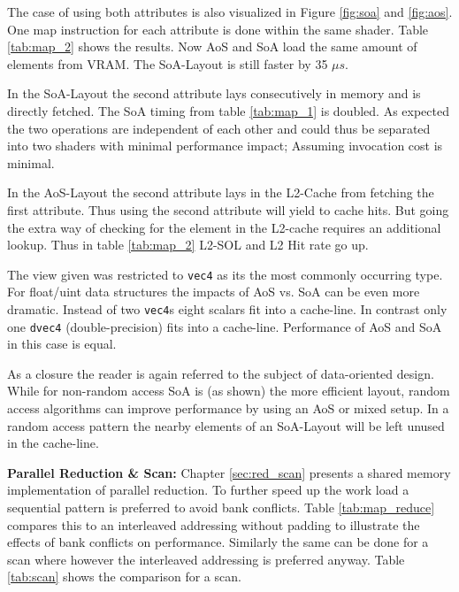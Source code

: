 \documentclass[m,times]{cgMA}
\begin{document}
The case of using both attributes is also visualized in Figure \ref{fig:soa} and \ref{fig:aos}. One map instruction for each attribute is done within the same shader. Table \ref{tab:map_2} shows the results. Now AoS and SoA load the same amount of elements from VRAM. The SoA-Layout is still faster by 35 $\mu s$.

In the SoA-Layout the second attribute lays consecutively in memory and is directly fetched. The SoA timing from table \ref{tab:map_1} is doubled. As expected the two operations are independent of each other and could thus be separated into two shaders with minimal performance impact; Assuming invocation cost is minimal.

In the AoS-Layout the second attribute lays in the L2-Cache from fetching the first attribute. Thus using the second attribute will yield to cache hits. But going the extra way of checking for the element in the L2-cache requires an additional lookup. Thus in table \ref{tab:map_2} L2-SOL and L2 Hit rate go up.

The view given was restricted to \texttt{vec4} as its the most commonly occurring type. For float/uint data structures the impacts of AoS vs. SoA can be even more dramatic. Instead of two \texttt{vec4}s eight scalars fit into a cache-line. In contrast only one \texttt{dvec4} (double-precision) fits into a cache-line. Performance of AoS and SoA in this case is equal.

As a closure the reader is again referred to the subject of data-oriented design. While for non-random access SoA is (as shown) the more efficient layout, random access algorithms can improve performance by using an AoS or mixed setup. In a random access pattern the nearby elements of an SoA-Layout will be left unused in the cache-line.

\textbf{Parallel Reduction \& Scan:} Chapter \ref{sec:red_scan} presents a shared memory implementation of parallel reduction. To further speed up the work load a sequential pattern is preferred to avoid bank conflicts. Table \ref{tab:map_reduce} compares this to an interleaved addressing without padding to illustrate the effects of bank conflicts on performance. Similarly the same can be done for a scan where however the interleaved addressing is preferred anyway. Table \ref{tab:scan} shows the comparison for a scan.
\end{document}
